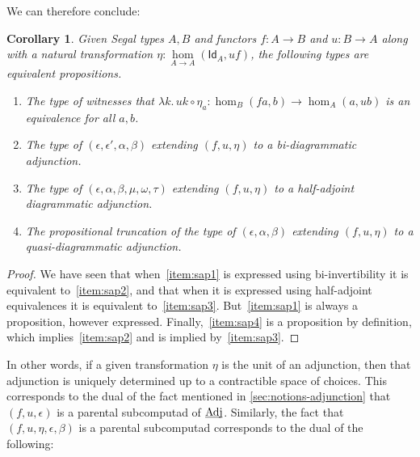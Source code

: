 \documentclass{amsart}
\theoremstyle{plain}
\newtheorem{cor}[thm]{Corollary}
\theoremstyle{definition}
\theoremstyle{remark}
\numberwithin{equation}{section}
\def\nat#1#2{\underset{#1\to#2}{\hom}}
\newcommand{\lam}[1]{\lambda #1.\,}
\newcommand{\idfunc}[1]{\mathsf{Id}_{#1}}
\begin{document}
We can therefore conclude:

\begin{cor}\label{thm:segal-adj-prop}
  Given Segal types $A,B$ and functors $f:A\to B$ and $u:B\to A$ along with a natural transformation $\eta:\nat AA (\idfunc A,uf)$, the following types are equivalent propositions.
  \begin{enumerate}[label=(\roman*)]
  \item The type of witnesses that $\lam{k} u k \circ \eta_a : \hom_B(fa,b) \to \hom_A(a,ub) $ is an equivalence for all $a,b$.\label{item:sap1}
  \item The type of $(\epsilon,\epsilon',\alpha,\beta)$ extending $(f,u,\eta)$ to a bi-diagrammatic adjunction.\label{item:sap2}
  \item The type of $(\epsilon,\alpha,\beta,\mu,\omega,\tau)$ extending $(f,u,\eta)$ to a half-adjoint diagrammatic adjunction.\label{item:sap3}
  \item The propositional truncation of the type of $(\epsilon,\alpha,\beta)$ extending $(f,u,\eta)$ to a quasi-diagrammatic adjunction.\label{item:sap4}
  \end{enumerate}
\end{cor}
\begin{proof}
  We have seen that when~\ref{item:sap1} is expressed using bi-invertibility it is equivalent to~\ref{item:sap2}, and that when it is expressed using half-adjoint equivalences it is equivalent to~\ref{item:sap3}.
  But~\ref{item:sap1} is always a proposition, however expressed.
  Finally,~\ref{item:sap4} is a proposition by definition, which implies~\ref{item:sap2} and is implied by~\ref{item:sap3}.
\end{proof}

In other words, if a given transformation $\eta$ is the unit of an adjunction, then that adjunction is uniquely determined up to a contractible space of choices.
This corresponds to the dual of the fact mentioned in \cref{sec:notions-adjunction} that $(f,u,\epsilon)$ is a parental subcomputad of $\underline{\smash[b]{\mathrm{Adj}}}$.
Similarly, the fact that $(f,u,\eta,\epsilon,\beta)$ is a parental subcomputad corresponds to the dual of the following:
\end{document}
